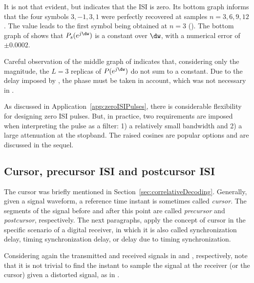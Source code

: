 It is not that evident, but  indicates that the ISI is zero. Its bottom graph informs that the four symbols $3, -1, 3, 1$ were perfectly recovered at samples $n=3, 6, 9, 12$. The value  leads to the first symbol being obtained at $n=3$ (). The bottom graph of  shows that $P_s(e^{j\dw})$ is a constant over $\dw$, with a numerical error of $\pm 0.0002$.

Careful observation of the middle graph of  indicates that, considering only the magnitude, the $L=3$ replicas of $P(e^{j\dw})$ do not sum to a constant. Due to the delay imposed by , the phase must be taken in account, which was not necessary in .
\eExample 

As discussed in Application~\ref{app:zeroISIPulses}, there is considerable flexibility for designing zero ISI pulses. But, in practice, two requirements are imposed when interpreting the pulse as a filter: 1) a relatively small bandwidth and 2) a large attenuation at the stopband. The raised cosines are popular options and are discussed in the sequel.

\subsection{Cursor, precursor ISI and postcursor ISI}

The cursor was briefly mentioned in Section~\ref{sec:correlativeDecoding}.
Generally, given a signal waveform, a reference time instant is sometimes 
 called \emph{cursor}. The segments of the signal before and after this point are called \emph{precursor} and \emph{postcursor}, respectively. 
The next paragraphs, apply the concept of cursor in the specific scenario of a digital receiver,
in which it is also called synchronization delay, timing synchronization delay, or delay due to timing synchronization.

Considering again the transmitted and received signals in  and 
 , respectively, note that it is not trivial to find the instant to sample the signal at the receiver (or the cursor)
given a distorted signal, as in .

